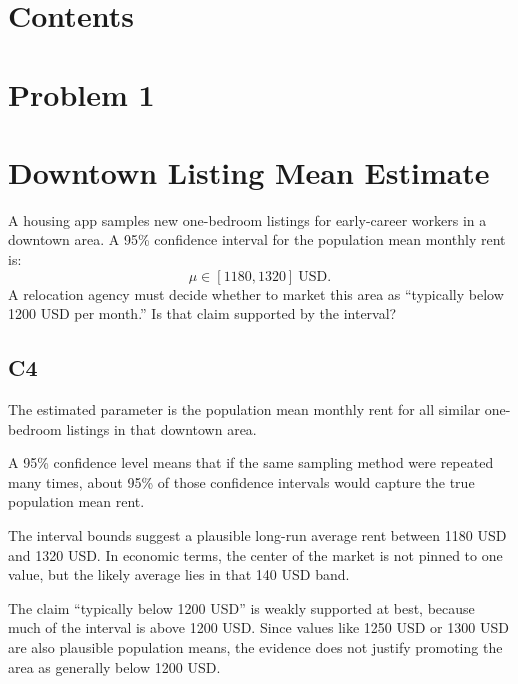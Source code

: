 


\section*{Contents}
\setcounter{tocdepth}{2}
\setcounter{secnumdepth}{1}
\tableofcontents


	\begin{ExamProblems}
		\item
		\section{Problem 1}
		\section{Downtown Listing Mean Estimate}
		A housing app samples new one-bedroom listings for early-career workers in a downtown area.
		A 95\% confidence interval for the population mean monthly rent is:
		\[
		\mu \in [1180, 1320]\ \text{USD}.
		\]
		A relocation agency must decide whether to market this area as ``typically below 1200 USD per month.''
		Is that claim supported by the interval?

		\subsection*{C4}
		The estimated parameter is the population mean monthly rent for all similar one-bedroom listings in that downtown area.

		A 95\% confidence level means that if the same sampling method were repeated many times, about 95\% of those confidence intervals would capture the true population mean rent.

		The interval bounds suggest a plausible long-run average rent between 1180 USD and 1320 USD.
		In economic terms, the center of the market is not pinned to one value, but the likely average lies in that 140 USD band.

		The claim ``typically below 1200 USD'' is weakly supported at best, because much of the interval is above 1200 USD.
		Since values like 1250 USD or 1300 USD are also plausible population means, the evidence does not justify promoting the area as generally below 1200 USD.


\end{ExamProblems}
